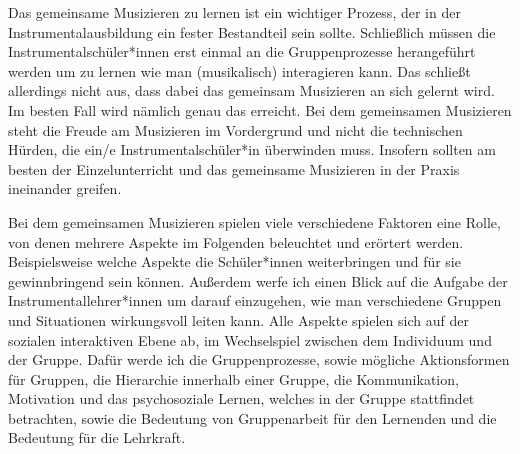 
Das gemeinsame Musizieren zu lernen ist ein wichtiger Prozess, der in der
Instrumentalausbildung ein fester Bestandteil sein sollte. Schließlich müssen
die Instrumentalschüler*innen erst einmal an die Gruppenprozesse herangeführt
werden um zu lernen wie man (musikalisch) interagieren kann. Das schließt
allerdings nicht aus, dass dabei das gemeinsam Musizieren an sich gelernt wird.
Im besten Fall wird nämlich genau das erreicht. Bei dem gemeinsamen Musizieren
steht die Freude am Musizieren im Vordergrund und nicht die technischen Hürden,
die ein/e Instrumentalschüler*in überwinden muss. Insofern sollten am besten der
Einzelunterricht und das gemeinsame Musizieren in der Praxis ineinander greifen.

Bei dem gemeinsamen Musizieren spielen viele verschiedene Faktoren eine Rolle,
von denen mehrere Aspekte im Folgenden beleuchtet und erörtert werden.
Beispielsweise welche Aspekte die Schüler*innen weiterbringen und für sie
gewinnbringend sein können. Außerdem werfe ich einen Blick auf die Aufgabe der
Instrumentallehrer*innen um darauf einzugehen, wie man verschiedene Gruppen und
Situationen wirkungsvoll leiten kann. Alle Aspekte spielen sich auf der sozialen
interaktiven Ebene ab, im Wechselspiel zwischen dem Individuum und der Gruppe.
Dafür werde ich die Gruppenprozesse, sowie mögliche Aktionsformen für Gruppen,
die Hierarchie innerhalb einer Gruppe, die Kommunikation, Motivation und das
psychosoziale Lernen, welches in der Gruppe stattfindet betrachten, sowie die
Bedeutung von Gruppenarbeit für den Lernenden und die Bedeutung für die
Lehrkraft.






























